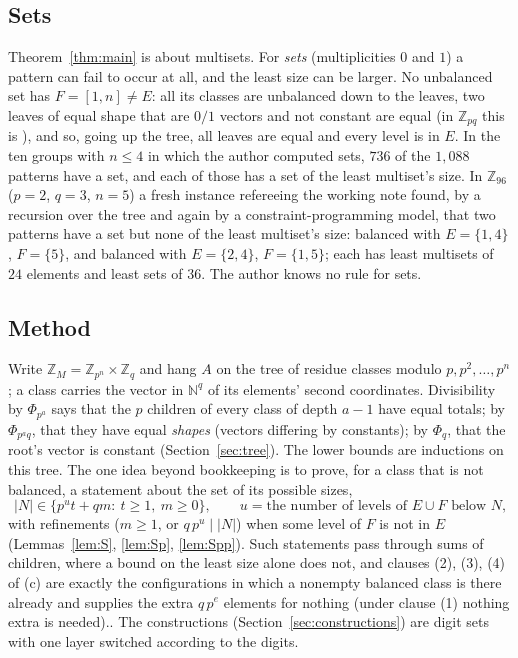 \documentclass[11pt,a4paper]{amsart}
\theoremstyle{definition}
\theoremstyle{remark}
\newcommand{\Z}{\mathbb{Z}}
\newcommand{\N}{\mathbb{N}}
\begin{document}
\subsection{Sets} Theorem~\ref{thm:main} is about multisets. For \emph{sets} (multiplicities $0$ and $1$)
a pattern can fail to occur at all, and the least size can be larger. No unbalanced set has $F=[1,n]\ne E$:
all its classes are unbalanced down to the leaves, two leaves of equal shape that are $0/1$ vectors and not
constant are equal (in $\Z_{pq}$ this is \cite[Proposition~3.8(a)]{KMSV}), and so, going up the tree, all leaves are equal and every level is in $E$. In the ten
groups with $n\le4$ in which the author computed sets, $736$ of the $1{,}088$ patterns have a set, and each
of those has a set of the least multiset's size. In $\Z_{96}$ ($p=2$, $q=3$, $n=5$) a fresh instance
refereeing the working note found, by a recursion over the tree and again by a constraint-programming model, that two
patterns have a set but none of the least multiset's size: balanced with $E=\{1,4\}$, $F=\{5\}$, and balanced
with $E=\{2,4\}$, $F=\{1,5\}$; each has least multisets of $24$ elements and least sets of $36$. The author knows no rule for sets.

\subsection{Method} Write $\Z_M=\Z_{p^n}\times\Z_q$ and hang $A$ on the tree of residue classes modulo
$p,p^2,\dots,p^n$; a class carries the vector in $\N^q$ of its elements' second coordinates. Divisibility by
$\Phi_{p^a}$ says that the $p$ children of every class of depth $a-1$ have equal totals; by $\Phi_{p^aq}$,
that they have equal \emph{shapes} (vectors differing by constants); by $\Phi_q$, that the root's vector is
constant (Section~\ref{sec:tree}). The lower bounds are inductions on this tree. The one idea beyond
bookkeeping is to prove, for a class that is not balanced, a statement about the set of its possible sizes,
\[ |N|\in\{p^ut+qm:\ t\ge 1,\ m\ge 0\},\qquad u=\text{the number of levels of $E\cup F$ below $N$,}\]
with refinements ($m\ge 1$, or $q\,p^u\mid |N|$) when some level of $F$ is not in $E$
(Lemmas~\ref{lem:S}, \ref{lem:Sp}, \ref{lem:Spp}). Such statements pass through sums of children, where a
bound on the least size alone does not, and clauses (2), (3), (4) of (c) are exactly the configurations in which a nonempty balanced class is
there already and supplies the extra $q\,p^{e}$ elements for nothing (under clause (1) nothing extra is
needed).. The constructions
(Section~\ref{sec:constructions}) are digit sets with one layer switched according to the digits.
\end{document}
